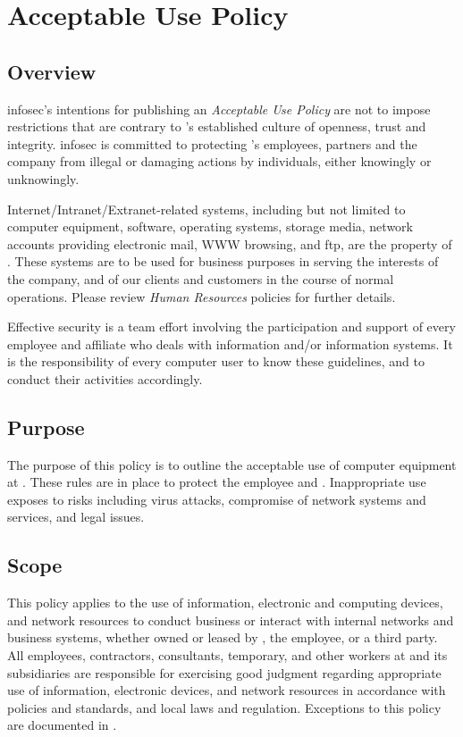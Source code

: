 \chapter{Acceptable Use Policy}\label{G:AUP}
\CommonIntroduction

\section{Overview}
\gls{infosec}'s intentions for publishing an \textsl{Acceptable Use Policy} are not to impose restrictions that are contrary to \CompanyName{}'s established culture of openness, trust and integrity.  
\gls{infosec} is committed to protecting \CompanyName{}'s employees, partners and the company from illegal or damaging actions by individuals, either knowingly or unknowingly.  

Internet/Intranet/Extranet-related systems, including but not limited to computer equipment, software, operating systems, storage media, network accounts providing electronic mail, WWW browsing, and \gls{ftp}, are the property of \CompanyName{}.  
These systems are to be used for business purposes in serving the interests of the company, and of our clients and customers in the course of normal operations.  
Please review \textsl{Human Resources} policies for further details.

Effective security is a team effort involving the participation and support of every \CompanyName{} employee and affiliate who deals with information and/or information systems. It is the responsibility of every computer user to know these guidelines, and to conduct their activities accordingly.

\section{Purpose}
The purpose of this policy is to outline the acceptable use of computer equipment at \CompanyName{}.  
These rules are in place to protect the employee and \CompanyName{}.  
Inappropriate use exposes \CompanyName{} to risks including virus attacks, compromise of network systems and services, and legal issues.  

\section{Scope}
This policy applies to the use of information, electronic and computing devices, and network resources to conduct \CompanyName{} business or interact with internal networks and business systems, whether owned or leased by \CompanyName{}, the employee, or a third party.  
All employees, contractors, consultants, temporary, and other workers at \CompanyName{} and its subsidiaries are responsible for exercising good judgment regarding appropriate use of information, electronic devices, and network resources in accordance with \CompanyName{} policies and standards, and local laws and regulation.
Exceptions to this policy are documented in .

